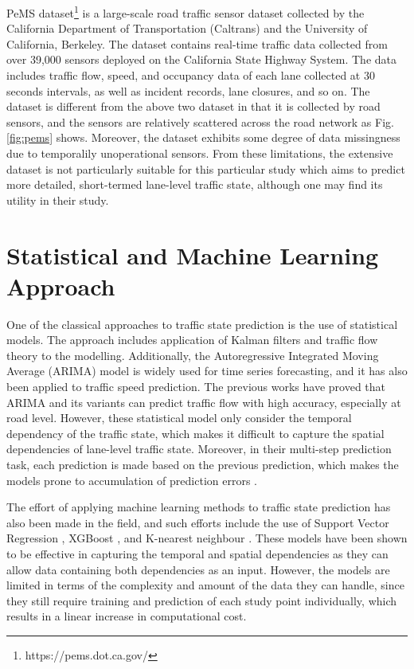 \documentclass[11pt]{uonthesis}
\begin{document}
PeMS dataset\footnote{https://pems.dot.ca.gov/} is a large-scale road traffic sensor dataset collected by the California Department of Transportation (Caltrans) and the University of California, Berkeley. The dataset contains real-time traffic data collected from over 39,000 sensors deployed on the California State Highway System. The data includes traffic flow, speed, and occupancy data of each lane collected at 30 seconds intervals, as well as incident records, lane closures, and so on. The dataset is different from the above two dataset in that it is collected by road sensors, and the sensors are relatively scattered across the road network as Fig. \ref{fig:pems} shows. Moreover, the dataset exhibits some degree of data missingness due to temporalily unoperational sensors. From these limitations, the extensive dataset is not particularly suitable for this particular study which aims to predict more detailed, short-termed lane-level traffic state, although one may find its utility in their study.

\section{Statistical and Machine Learning Approach}

One of the classical approaches to traffic state prediction is the use of statistical models. The approach includes application of Kalman filters \cite{kalman} and traffic flow theory \cite{traffictheory} to the modelling. Additionally, the Autoregressive Integrated Moving Average (ARIMA) model is widely used for time series forecasting, and it has also been applied to traffic speed prediction. The previous works \cite{karima}\cite{arimax}\cite{starima} have proved that ARIMA and its variants can predict traffic flow with high accuracy, especially at road level. However, these statistical model only consider the temporal dependency of the traffic state, which makes it difficult to capture the spatial dependencies of lane-level traffic state. Moreover, in their multi-step prediction task, each prediction is made based on the previous prediction, which makes the models prone to accumulation of prediction errors \cite{gdl}.

The effort of applying machine learning methods to traffic state prediction has also been made in the field, and such efforts include the use of Support Vector Regression \cite{svr}, XGBoost \cite{xgboost}, and K-nearest neighbour \cite{knn}. These models have been shown to be effective in capturing the temporal and spatial dependencies as they can allow data containing both dependencies as an input. However, the models are limited in terms of the complexity and amount of the data they can handle, since they still require training and prediction of each study point individually, which results in a linear increase in computational cost.
\end{document}
